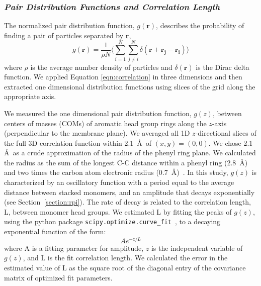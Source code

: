   \subsubsection{\textit{Pair Distribution Functions and Correlation Length}}\label{section:correlation_length}

  The normalized pair distribution function, $g(\mathbf{r})$, describes
  the probability of finding a pair of particles separated by $\mathbf{r}$,
  \begin{equation}
	g(\mathbf{r})= \frac{1}{\rho N} \Bigg \langle \sum_{i=1}^{N}\sum_{j\neq i}^{N} \delta(\mathbf{r}+\mathbf{r_j}-\mathbf{r_i}) \Bigg \rangle
	\label{eqn:correlation}
  \end{equation}
  where $\rho$ is the average number density of particles and
  $\delta(\mathbf{r})$ is the Dirac delta function\cite{kuriabova_linear_2010}.
  We applied Equation \ref{eqn:correlation} in three dimensions and then
  extracted one dimensional distribution functions using slices of the grid
  along the appropriate axis.

  We measured the one dimensional pair distribution function, $g(z)$, between centers 
  of masses (COMs) of aromatic head group rings along the $z$-axis (perpendicular to
  the membrane plane). We averaged all 1D $z$-directional slices of the full 3D 
  correlation function within 2.1~\AA~of $(x, y)=(0, 0)$. We chose 2.1 \AA~as a crude 
  approximation of the radius of the phenyl ring plane. 
  We calculated the radius as the sum of the longest C-C distance within a phenyl 
  ring (2.8~\AA) and two times the carbon atom electronic radius (0.7~\AA)~\cite{slater_atomic_1964}.
  In this study, $g(z)$ is characterized by an oscillatory function with a period equal to the
  average distance between stacked monomers, and an amplitude that decays exponentially
  (see Section~\ref{section:rpi}). The rate of decay is related to the correlation 
  length, L, between monomer head groups. We estimated L by fitting the peaks of $g(z)$,
  using the python package \texttt{scipy.optimize.curve\_fit}~\cite{oliphant_python_2007},
  to a decaying exponential function of the form:
  \begin{equation}
  	Ae^{-z/L}
  	\label{eqn:decaying_exponential}
  \end{equation}
  where A is a fitting parameter for amplitude, $z$ is the independent variable of $g(z)$, 
  and L is the fit correlation length. We calculated the error in the estimated value
  of L as the square root of the diagonal entry of the covariance matrix of 
  optimized fit parameters.
  
